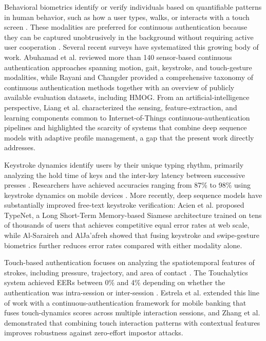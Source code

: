 \documentclass[3p,times,procedia]{elsarticle}
\begin{document}
Behavioral biometrics identify or verify individuals based on
quantifiable patterns in human behavior, such as how a user
types, walks, or interacts with a touch screen
\cite{alzubaidi_authentication_2016}. These modalities are preferred for
continuous authentication because they can be captured
unobtrusively in the background without requiring active user
cooperation \cite{abuhamad_autosen_2020}. Several recent surveys have
systematized this growing body of work. Abuhamad et al.
\cite{abuhamad_sensorbased_2021} reviewed more than 140
sensor-based continuous authentication approaches spanning
motion, gait, keystroke, and touch-gesture modalities, while
Rayani and Changder \cite{rayani_continuous_2023} provided a
comprehensive taxonomy of continuous authentication methods
together with an overview of publicly available evaluation
datasets, including HMOG. From an artificial-intelligence
perspective, Liang et al. \cite{liang_behavioral_2020}
characterized the sensing, feature-extraction, and learning
components common to Internet-of-Things continuous-authentication
pipelines and highlighted the scarcity of systems that combine
deep sequence models with adaptive profile management, a gap
that the present work directly addresses.

Keystroke dynamics identify users by their unique typing rhythm,
primarily analyzing the hold time of keys and the inter-key
latency between successive presses \cite{saevanee_continuous_2015}.
Researchers have achieved accuracies ranging from 87\% to 98\%
using keystroke dynamics on mobile devices
\cite{saevanee_continuous_2015}. More recently, deep sequence
models have substantially improved free-text keystroke
verification: Acien et al. \cite{acien_typenet_2021} proposed
TypeNet, a Long Short-Term Memory-based Siamese architecture
trained on tens of thousands of users that achieves competitive
equal error rates at web scale, while Al-Saraireh and
AlJa'afreh \cite{alsaraireh_keystroke_2023} showed that fusing
keystroke and swipe-gesture biometrics further reduces error
rates compared with either modality alone.

Touch-based authentication focuses on analyzing the
spatiotemporal features of strokes, including pressure,
trajectory, and area of contact \cite{frank_touchalytics_2013}. The
Touchalytics system achieved EERs between 0\% and 4\%
depending on whether the authentication was intra-session
or inter-session \cite{frank_touchalytics_2013}. Estrela et al.
\cite{estrela_framework_2021} extended this line of work with a
continuous-authentication framework for mobile banking that
fuses touch-dynamics scores across multiple interaction
sessions, and Zhang et al. \cite{zhang_multimodal_2021}
demonstrated that combining touch interaction patterns with
contextual features improves robustness against zero-effort
impostor attacks.
\end{document}
